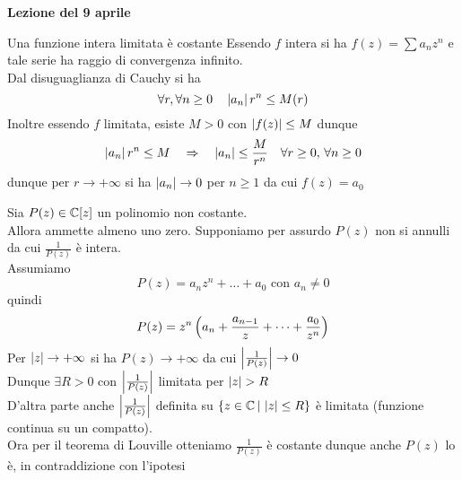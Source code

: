 

\textbf{Lezione del 9 aprile}
\begin{thm}[di Liouville]\spazio
Una funzione intera limitata \`e costante
\proof Essendo $f$ intera si ha $f(z) = \sum a_n z^n$ e tale serie ha raggio di convergenza infinito.\\
Dal disuguaglianza di Cauchy si ha $$\forall r, \forall n \geq 0 \quad  \left\vert a_n \right\vert r^n \leq M(r)$$
Inoltre essendo $f$ limitata, esiste $M>0$ con $\left\vert f(z) \right\vert\leq M$ dunque 
$$ \left\vert a_n \right\vert r^n \leq M \quad \Rightarrow \quad \left\vert a_n \right\vert \leq \frac{M}{r^n} \quad \forall r\geq 0,\, \forall n\geq 0$$ 
dunque per $r\to + \infty$ si ha $\left\vert a_n \right\vert\to 0$ per $n \geq 1 $ da cui $f(z) =a_0$
\end{thm}
\begin{thm}\bianco
Sia $P(z)\in \mathbb{C}[z]$ un polinomio non costante.\\
Allora ammette almeno uno zero.
\proof Supponiamo per assurdo $P(z)$ non si annulli da cui $\frac{1}{P(z)}$ \`e intera.\\
Assumiamo $$P(z) = a_n z^n + \dots + a_0 \text{ con }  a_n \neq 0$$ quindi
$$ P(z) =z^n \left( a_n + \frac{a_{n-1}}{z}+\dots +\frac{a_0}{z^n} \right)$$
Per $\left\vert z \right\vert\to +\infty$ si ha $P(z) \to +\infty$ da cui $\left\vert \frac{1}{P(z)} \right\vert \to 0 $\\
Dunque $\exists R>0$ con $\left\vert \frac{1}{P(z)} \right\vert$ limitata per $\left\vert z \right\vert >R$\\
D'altra parte anche $\left\vert \frac{1}{P(z)} \right\vert$ definita su $\{ z\in \mathbb{C}\, \vert \, \left\vert z \right\vert \leq R\}$ \`e limitata (funzione continua su un compatto).\\
Ora per il teorema di Louville otteniamo $\frac{1}{P(z)}$ \`e costante dunque anche $P(z)$ lo \`e, in contraddizione con l'ipotesi
\endproof
\end{thm}
\newpage
